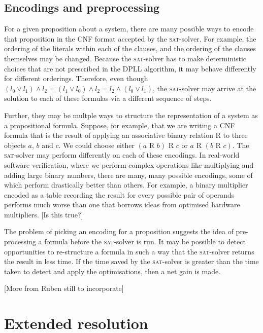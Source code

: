 \documentclass[proof,pdftex,11pt,a4]{article}
\newcommand{\sat}{\textsc{sat}}
\begin{document}
\subsection{Encodings and preprocessing}

For a given proposition about a system, there are many possible ways to encode that proposition in the CNF format accepted by the \sat{}-solver. For example, the ordering of the literals within each of the clauses, and the ordering of the clauses themselves may be changed. Because the \sat{}-solver has to make deterministic choices that are not prescribed in the DPLL algorithm, it may behave differently for different orderings. Therefore, even though $(l_0 \vee l_1) \wedge l_2 = (l_1 \vee l_0) \wedge l_2 = l_2 \wedge (l_0 \vee l_1)$, the \sat{}-solver may arrive at the solution to each of these formulas via a different sequence of steps.

Further, they may be multple ways to structure the representation of a system as a propositional formula. Suppose, for example, that we are writing a CNF formula that is the result of applying an associative binary relation R to three objects $a$, $b$ and $c$. We could choose either $(a\mbox{ R }b)\mbox{ R }c$ or $a\mbox{ R }(b\mbox{ R }c)$. The \sat{}-solver may perform differently on each of these encodings. In real-world software verification, where we perform complex operations like multiplying and adding large binary numbers, there are many, many possible encodings, some of which perform drastically better than others. For example, a binary multiplier encoded as a table recording the result for every possible pair of operands performs much worse than one that borrows ideas from optimised hardware multipliers. [Is this true?]

The problem of picking an encoding for a proposition suggests the idea of pre-processing a formula before the \sat{}-solver is run. It may be possible to detect opportunities to re-structure a formula in such a way that the \sat{}-solver returns the result in less time. If the time saved by the \sat{}-solver is greater than the time taken to detect and apply the optimisations, then a net gain is made.

[More from Ruben still to incorporate]

\section{Extended resolution}
\end{document}
